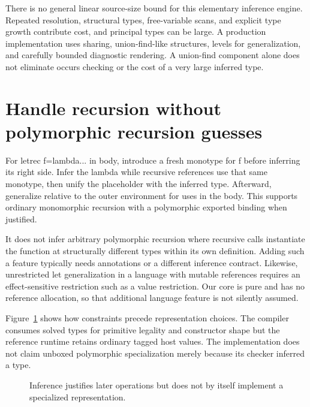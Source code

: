 There is no general linear source-size bound for this elementary inference engine.
Repeated resolution, structural types, free-variable scans, and explicit type growth contribute cost, and principal types can be large.
A production implementation uses sharing, union-find-like structures, levels for generalization, and carefully bounded diagnostic rendering.
A union-find component alone does not eliminate occurs checking or the cost of a very large inferred type.

\section{Handle recursion without polymorphic recursion guesses}
\label{sec:ch90-recursive}
For letrec f=lambda... in body, introduce a fresh monotype for f before inferring its right side.
Infer the lambda while recursive references use that same monotype, then unify the placeholder with the inferred type.
Afterward, generalize relative to the outer environment for uses in the body.
This supports ordinary monomorphic recursion with a polymorphic exported binding when justified.

It does not infer arbitrary polymorphic recursion where recursive calls instantiate the function at structurally different types within its own definition.
Adding such a feature typically needs annotations or a different inference contract.
Likewise, unrestricted let generalization in a language with mutable references requires an effect-sensitive restriction such as a value restriction.
Our core is pure and has no reference allocation, so that additional language feature is not silently assumed.

Figure~\ref{fig:ch90-flow} shows how constraints precede representation choices.
The compiler consumes solved types for primitive legality and constructor shape but the reference runtime retains ordinary tagged host values.
The implementation does not claim unboxed polymorphic specialization merely because its checker inferred a type.

\begin{figure}[htbp]
\centering
{}
\caption{Inference justifies later operations but does not by itself implement a specialized representation.}
\label{fig:ch90-flow}
\end{figure}

